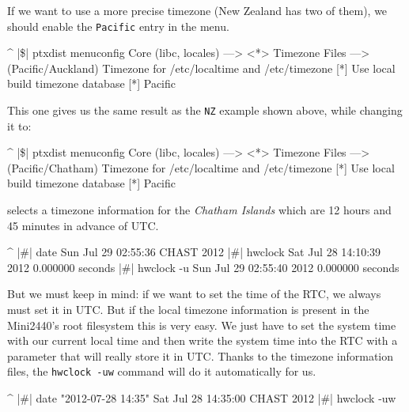 If we want to use a more precise timezone (New Zealand has two of them), we
should enable the \texttt{Pacific} entry in the \ptxdist{} menu.

\begin{ptxshell}[escapechar=|]{^}
|\$| ptxdist menuconfig
  Core (libc, locales) --->
    <*> Timezone Files --->
      (Pacific/Auckland) Timezone for /etc/localtime and /etc/timezone
      [*]   Use local build timezone database
      [*]   Pacific
\end{ptxshell}

This one gives us the same result as the \texttt{NZ} example shown above, while
changing it to:

\begin{ptxshell}[escapechar=|]{^}
|\$| ptxdist menuconfig
  Core (libc, locales) --->
    <*> Timezone Files --->
      (Pacific/Chatham) Timezone for /etc/localtime and /etc/timezone
      [*]   Use local build timezone database
      [*]   Pacific
\end{ptxshell}

selects a timezone information for the \textit{Chatham Islands} which are 12
hours and 45 minutes in advance of UTC.

\begin{ptxshell}[escapechar=|]{^}
|\#| date
Sun Jul 29 02:55:36 CHAST 2012
|\#| hwclock
Sat Jul 28 14:10:39 2012  0.000000 seconds
|\#| hwclock -u
Sun Jul 29 02:55:40 2012  0.000000 seconds
\end{ptxshell}

But we must keep in mind: if we want to set the time of the RTC, we always
must set it in UTC. But if the local timezone information is present in the
Mini2440's root filesystem this is very easy. We just have to set the system
time with our current local time and then write the system time into the RTC
with a parameter that will really store it in UTC. Thanks to the timezone
information files, the \texttt{hwclock -uw} command will do it automatically
for us.

\begin{ptxshell}[escapechar=|]{^}
|\#| date "2012-07-28 14:35"
Sat Jul 28 14:35:00 CHAST 2012
|\#| hwclock -uw
\end{ptxshell}
